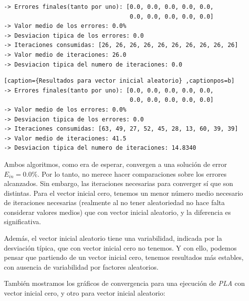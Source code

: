 \documentclass[11pt]{article}
\begin{document}
\begin{lstlisting}[caption={Resultados para vector inicial cero}, captionpos=b]
-> Errores finales(tanto por uno): [0.0, 0.0, 0.0, 0.0, 0.0,
                                    0.0, 0.0, 0.0, 0.0, 0.0]
-> Valor medio de los errores: 0.0%
-> Desviacion tipica de los errores: 0.0
-> Iteraciones consumidas: [26, 26, 26, 26, 26, 26, 26, 26, 26, 26]
-> Valor medio de iteraciones: 26.0
-> Desviacion tipica del numero de iteraciones: 0.0
\end{lstlisting}

\begin{lstlisting}[caption={Resultados para vector inicial aleatorio} ,captionpos=b]
-> Errores finales(tanto por uno): [0.0, 0.0, 0.0, 0.0, 0.0,
                                    0.0, 0.0, 0.0, 0.0, 0.0]
-> Valor medio de los errores: 0.0%
-> Desviacion tipica de los errores: 0.0
-> Iteraciones consumidas: [63, 49, 27, 52, 45, 28, 13, 60, 39, 39]
-> Valor medio de iteraciones: 41.5
-> Desviacion tipica del numero de iteraciones: 14.8340
\end{lstlisting}

Ambos algoritmos, como era de esperar, convergen a una solución de error $E_{in} = 0.0\%$. Por lo tanto, no merece hacer comparaciones sobre los errores alcanzados. Sin embargo, las iteraciones necesarias para converger sí que son distintas. Para el vector inicial cero, tenemos un menor número medio necesario de iteraciones necesarias (realmente al no tener aleatoriedad no hace falta considerar valores medios) que con vector inicial aleatorio, y la diferencia es significativa.

Además, el vector inicial aleatorio tiene una variabilidad, indicada por la desviación típica, que con vector inicial cero no tenemos. Y con ello, podemos pensar que partiendo de un vector inicial cero, tenemos resultados más estables, con ausencia de variabilidad por factores aleatorios.

También mostramos los gráficos de convergencia para una ejecución de \emph{PLA} con vector inicial cero, y otro para vector inicial aleatorio:
\end{document}
